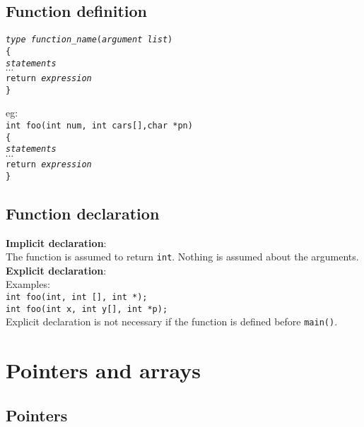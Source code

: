 \begin{multicols*}{3}
\subsection{Function definition}
\texttt{\textit{type function\_name}(\textit{argument list})}\\
\texttt{\{}\\
\qquad \texttt{\textit{statements}}\\
\qquad \texttt{$ \cdots $}\\
\qquad \texttt{return \textit{expression}}\\
\texttt{\}}

eg:\\

\texttt{int foo(int num, int cars[],char *pn)}\\
\texttt{\{}\\
\qquad \texttt{\textit{statements}}\\
\qquad \texttt{$ \cdots $}\\
\qquad \texttt{return \textit{expression}}\\
\texttt{\}}

\subsection{Function declaration}

\textbf{Implicit declaration}:\\
The function is assumed to return \texttt{int}. Nothing is assumed about the arguments.\\
\textbf{Explicit declaration}:\\
Examples:\\
\texttt{int foo(int, int [], int *);}\\
\texttt{int foo(int x, int y[], int *p);}\\
Explicit declaration is not necessary if the function is defined before \texttt{main()}.\\

\vfill \null
\columnbreak

\section{Pointers and arrays}

\subsection{Pointers}


\end{multicols*}
